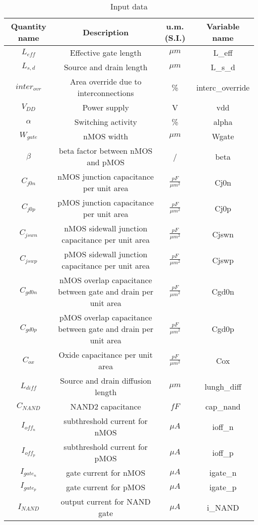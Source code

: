 \begin{table}[htbp]
	\begin{center}
		\begin{tabular}{|c|c|c|c|} \hline
			\textbf{Quantity name} & \textbf{Description} & \textbf{u.m. (S.I.)} & \textbf{Variable name} \\ \hline
			$L_{eff}$ & Effective gate length & $\mu m$ & L\_eff \\ 
			$L_{s,d}$ & Source and drain length & $\mu m$ & L\_s\_d \\
			$inter_{ovr}$ & Area override due to interconnections & \% & interc\_override \\
			$V_{DD}$ & Power supply & V & vdd \\
			$\alpha$ & Switching activity & \% & alpha \\
			$W_{gate}$ & nMOS width & $\mu m$ & Wgate \\
			$\beta$ & beta factor between nMOS and pMOS & / & beta \\
			$C_{j0n}$ & nMOS junction capacitance per unit area & $\frac{pF}{\mu m^2}$ & Cj0n \\
			$C_{j0p}$ & pMOS junction capacitance per unit area & $\frac{pF}{\mu m^2}$ & Cj0p \\
			$C_{jswn}$ & nMOS sidewall junction capacitance per unit area & $\frac{pF}{\mu m^2}$ & Cjswn \\
			$C_{jswp}$ & pMOS sidewall junction capacitance per unit area & $\frac{pF}{\mu m^2}$ & Cjswp \\
			$C_{gd0n}$ & nMOS overlap capacitance between gate and drain per unit area & $\frac{pF}{\mu m^2}$ & Cgd0n \\
			$C_{gd0p}$ & pMOS overlap capacitance between gate and drain per unit area & $\frac{pF}{\mu m^2}$ & Cgd0p \\
			$C_{ox}$ & Oxide capacitance per unit area & $\frac{pF}{\mu m^2}$ & Cox \\
			$L_{diff}$ & Source and drain diffusion length & $\mu m$ & lungh\_diff \\
			$C_{NAND}$ & NAND2 capacitance & $fF$ & cap\_nand \\
			$I_{off_n}$ & subthreshold current for nMOS & $\mu A$ & ioff\_n \\
			$I_{off_p}$ & subthreshold current for pMOS & $\mu A$ & ioff\_p \\
			$I_{gate_n}$ & gate current for nMOS & $\mu A$ & igate\_n \\
			$I_{gate_p}$ & gate current for pMOS & $\mu A$ & igate\_p \\
			$I_{NAND}$ & output current for NAND gate & $\mu A$ & i\_NAND \\ \hline
		\end{tabular}
	\end{center}
	\caption{Input data}
	\label{tab_in_data}
\end{table}

